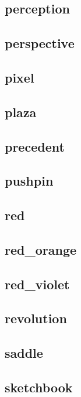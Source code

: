 \subsection{\ttfamily perception}
\newpage
\subsection{\ttfamily perspective}
\newpage
\subsection{\ttfamily pixel}
\newpage
\subsection{\ttfamily plaza}
\newpage
\subsection{\ttfamily precedent}
\newpage
\subsection{\ttfamily pushpin}
\newpage
\subsection{\ttfamily red}
\newpage
\subsection{\ttfamily red\_orange}
\newpage
\subsection{\ttfamily red\_violet}
\newpage
\subsection{\ttfamily revolution}
\newpage
\subsection{\ttfamily saddle}
\newpage
\subsection{\ttfamily sketchbook}
\newpage
